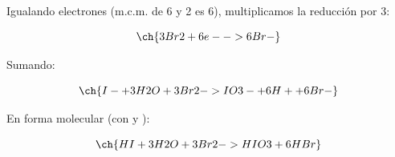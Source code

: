 \begin{exercise}
\begin{solu}
        Igualando electrones (m.c.m. de 6 y 2 es 6), multiplicamos la reducción por 3:

        \begin{equation*}
            \ch{3 Br2 + 6 e- -> 6 Br-}
        \end{equation*}

        Sumando:

        \begin{equation*}
            \ch{I- + 3 H2O + 3 Br2 -> IO3- + 6 H+ + 6 Br-}
        \end{equation*}

        En forma molecular (con  y ):

        \begin{equation*}
            \ch{HI + 3 H2O + 3 Br2 -> HIO3 + 6 HBr}
        \end{equation*}

    \end{solu}
\end{exercise}

